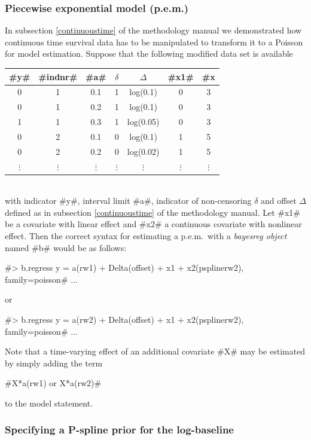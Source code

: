 \subsubsection*{Piecewise exponential model (p.e.m.)}

In subsection \ref*{continuoustime} of the methodology manual we
demonstrated how continuous time survival data has to be
manipulated to transform it to a Poisson for model estimation.
Suppose that the following modified data set is available
\vspace{0.5cm}\\
\begin{tabular}{c|c|c|c|c|c|c}
#y# & #indnr# & #a# & $\delta$ &  $\Delta$ &   #x1# &
#x#2\\\hline\hline
0 &  1 &   0.1 &   1  &  log(0.1) & 0  & 3\\
0  & 1   & 0.2  &  1  &  log(0.1) & 0 &  3\\
1  & 1   & 0.3  &  1  &  log(0.05)& 0  & 3\\\hline
0 &  2 &   0.1 &   0 &   log(0.1) & 1 &  5\\
0  & 2  &  0.2 &   0  &  log(0.02)& 1 &  5\\\hline
$\vdots$ & $\vdots$ & $\vdots$ & $\vdots$ & $\vdots$ & $\vdots$& $\vdots$\\
\end{tabular}
\vspace{0.5cm}\\
with indicator #y#, interval limit #a#, indicator of non-censoring
$\delta$ and offset $\Delta$ defined as in subsection
\ref*{continuoustime} of the methodology manual. Let #x1# be a
covariate with linear effect and #x2# a continuous covariate with
nonlinear effect. Then the correct syntax for estimating a
p.e.m.~with a {\em bayesreg object} named #b#  would be as
follows:

 #> b.regress y = a(rw1) + Delta(offset) + x1 + x2(psplinerw2), family=poisson# $\ldots$

or

 #> b.regress y = a(rw2) + Delta(offset) + x1 + x2(psplinerw2), family=poisson# $\ldots$


Note that a time-varying effect of an additional covariate #X# may
be estimated by simply adding the term

#X*a(rw1) or X*a(rw2)#

to the model statement.

\subsubsection*{Specifying a P-spline prior for the log-baseline}


